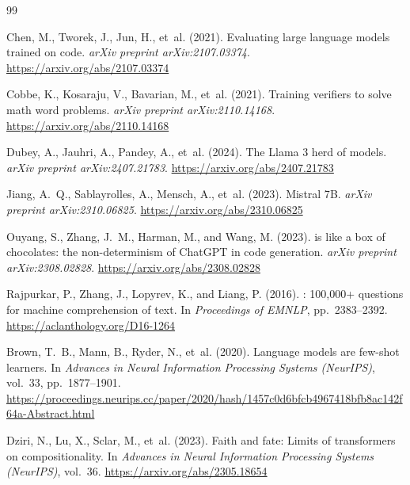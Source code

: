 \documentclass[runningheads]{llncs}
\begin{document}
\begin{thebibliography}{99}

Chen, M., Tworek, J., Jun, H., et~al. (2021).
\newblock Evaluating large language models trained on code.
\newblock \emph{arXiv preprint arXiv:2107.03374}.
\newblock \url{https://arxiv.org/abs/2107.03374}

Cobbe, K., Kosaraju, V., Bavarian, M., et~al. (2021).
\newblock Training verifiers to solve math word problems.
\newblock \emph{arXiv preprint arXiv:2110.14168}.
\newblock \url{https://arxiv.org/abs/2110.14168}

Dubey, A., Jauhri, A., Pandey, A., et~al. (2024).
\newblock The {L}lama 3 herd of models.
\newblock \emph{arXiv preprint arXiv:2407.21783}.
\newblock \url{https://arxiv.org/abs/2407.21783}

Jiang, A.~Q., Sablayrolles, A., Mensch, A., et~al. (2023).
\newblock Mistral 7{B}.
\newblock \emph{arXiv preprint arXiv:2310.06825}.
\newblock \url{https://arxiv.org/abs/2310.06825}

Ouyang, S., Zhang, J.~M., Harman, M., and Wang, M. (2023).
 is like a box of chocolates: the non-determinism of {ChatGPT} in code generation.
\newblock \emph{arXiv preprint arXiv:2308.02828}.
\newblock \url{https://arxiv.org/abs/2308.02828}

Rajpurkar, P., Zhang, J., Lopyrev, K., and Liang, P. (2016).
: 100,000+ questions for machine comprehension of text.
\newblock In \emph{Proceedings of EMNLP}, pp.\ 2383--2392.
\newblock \url{https://aclanthology.org/D16-1264}

Brown, T.~B., Mann, B., Ryder, N., et~al. (2020).
\newblock Language models are few-shot learners.
\newblock In \emph{Advances in Neural Information Processing Systems (NeurIPS)}, vol.~33, pp.\ 1877--1901.
\newblock \url{https://proceedings.neurips.cc/paper/2020/hash/1457c0d6bfcb4967418bfb8ac142f64a-Abstract.html}

Dziri, N., Lu, X., Sclar, M., et~al. (2023).
\newblock Faith and fate: Limits of transformers on compositionality.
\newblock In \emph{Advances in Neural Information Processing Systems (NeurIPS)}, vol.~36.
\newblock \url{https://arxiv.org/abs/2305.18654}


\end{thebibliography}
\end{document}
